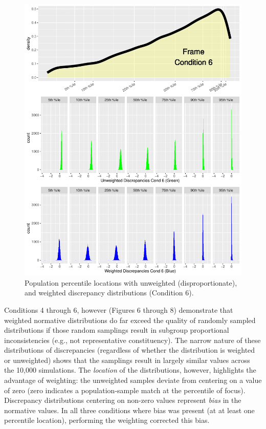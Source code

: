 \documentclass[
  ,man]{apa7}
\begin{document}
\begin{figure}
\centering
\includegraphics{NormsBuilding_files/figure-latex/Figure8-1.pdf}
\caption{\label{fig:Figure8}Population percentile locations with unweighted (disproportionate), and weighted discrepancy distributions (Condition 6).}
\end{figure}

Conditions 4 through 6, however (Figures 6 through 8) demonstrate that weighted normative distributions do far exceed the quality of randomly sampled distributions if those random samplings result in subgroup proportional inconsistencies (e.g., not representative constituency). The narrow nature of these distributions of discrepancies (regardless of whether the distribution is weighted or unweighted) shows that the samplings result in largely similar values across the 10,000 simulations. The \emph{location} of the distributions, however, highlights the advantage of weighting: the unweighted samples deviate from centering on a value of zero (zero indicates a population-sample match at the percentile of focus). Discrepancy distributions centering on non-zero values represent \emph{bias} in the normative values. In all three conditions where bias was present (at at least one percentile location), performing the weighting corrected this bias.
\end{document}
